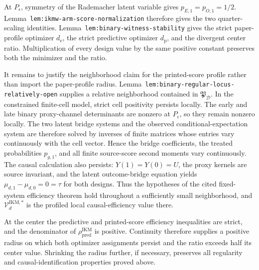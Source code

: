 At \(P_\epsilon\), symmetry of the Rademacher latent variable gives \(p_{E,1}=p_{O,1}=1/2\). Lemma~\texttt{lem:ikmw-arm-score-normalization} therefore gives the two quarter-scaling identities. Lemma~\texttt{lem:binary-witness-stability} gives the strict paper-profile optimizer \(d_{\mathrm e}\), the strict predictive optimizer \(d_{\mathrm p}\), and the divergent center ratio. Multiplication of every design value by the same positive constant preserves both the minimizer and the ratio.

It remains to justify the neighborhood claim for the printed-score profile rather than import the paper-profile radius.  Lemma~\texttt{lem:binary-regular-locus-relatively-open} supplies a relative neighborhood contained in \(\mathfrak P_{\mathcal D}\).  In the constrained finite-cell model, strict cell positivity persists locally.  The early and late binary proxy-channel determinants are nonzero at \(P_\epsilon\), so they remain nonzero locally.  The two latent bridge systems and the observed conditional-expectation system are therefore solved by inverses of finite matrices whose entries vary continuously with the cell vector.  Hence the bridge coefficients, the treated probabilities \(p_{g,1}\), and all finite source-score second moments vary continuously.  The causal calculation also persists: \(Y(1)=Y(0)=U\), the proxy kernels are source invariant, and the latent outcome-bridge equation yields \(\mu_{d,1}-\mu_{d,0}=0=\tau\) for both designs.  Thus the hypotheses of the cited fixed-system efficiency theorem hold throughout a sufficiently small neighborhood, and \(\mathcal V_d^{\mathrm{IKM},*}\) is the profiled local causal-efficiency value there.

At the center the predictive and printed-score efficiency inequalities are strict, and the denominator of \(\rho_{\mathrm{pred}}^{\mathrm{IKM}}\) is positive. Continuity therefore supplies a positive radius on which both optimizer assignments persist and the ratio exceeds half its center value. Shrinking the radius further, if necessary, preserves all regularity and causal-identification properties proved above.